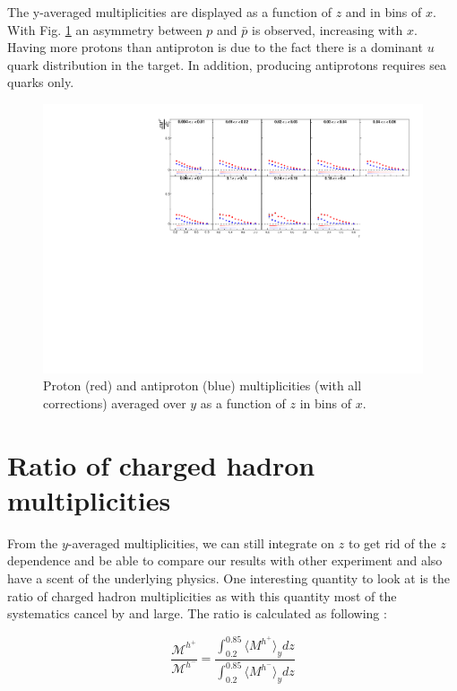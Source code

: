 The y-averaged multiplicities are displayed as a function of $z$ and in bins of $x$. With Fig. \ref{pic:mpyavg} an asymmetry between $p$ and $\bar{p}$ is observed, increasing with $x$. Having more protons than antiproton is due to the fact there is a dominant $u$ quark distribution in the target. In addition, producing antiprotons requires sea quarks only.

\begin{figure}[!h]
  \centering
	\includegraphics[scale=0.85]{./gfx/pyavg.pdf}
	\caption{Proton (red) and antiproton (blue) multiplicities (with all corrections) averaged over $y$ as a function of $z$ in bins of $x$.}
	\label{pic:mpyavg}
\end{figure}

\newpage

\section{Ratio of charged hadron multiplicities}

From the $y$-averaged multiplicities, we can still integrate on $z$ to get rid of the $z$ dependence and be able to compare our results with other experiment and also have a scent of the underlying physics. One interesting quantity to look at is the ratio of charged hadron multiplicities as with this quantity most of the systematics cancel by and large. The ratio is calculated as following :

\begin{equation}
  \frac{\mathscr{M}^{h^+}}{\mathscr{M}^{h^-}} = \frac{\int_{0.2}^{0.85} \langle M^{h^+} \rangle_y dz}{\int_{0.2}^{0.85} \langle M^{h^-} \rangle_y dz}
\end{equation}

